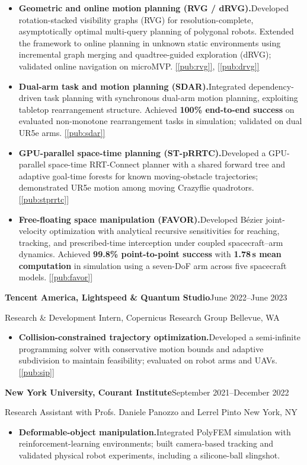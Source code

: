 \documentclass[11pt,letterpaper]{article}
\newcommand{\entry}[2]{\Needspace{6\baselineskip}\textbf{#1}\hfill #2\par}
\newcommand{\project}[2]{\item \textbf{#1}\enspace #2}
\newcommand{\paperref}[1]{\hyperref[pub:#1]{[\ref*{pub:#1}]}}
\begin{document}
\begin{itemize}
  \project{Geometric and online motion planning (RVG / dRVG).}{Developed
  rotation-stacked visibility graphs (RVG) for resolution-complete, asymptotically
  optimal multi-query planning of polygonal robots. Extended the framework to online planning
  in unknown static environments using incremental graph merging and
  quadtree-guided exploration (dRVG); validated online navigation on microMVP.
  \paperref{rvg}, \paperref{drvg}}

  \project{Dual-arm task and motion planning (SDAR).}{Integrated
  dependency-driven task planning with synchronous dual-arm motion planning,
  exploiting tabletop rearrangement structure. Achieved \textbf{100\% end-to-end success}
  on evaluated non-monotone
  rearrangement tasks in simulation; validated on dual UR5e arms. \paperref{sdar}}

  \project{GPU-parallel space-time planning (ST-pRRTC).}{Developed a
  GPU-parallel space-time RRT-Connect planner with
  a shared forward tree and adaptive goal-time forests for known moving-obstacle
  trajectories; demonstrated UR5e motion among moving Crazyflie quadrotors.
  \paperref{stprrtc}}

  \project{Free-floating space manipulation (FAVOR).}{Developed B\'ezier
  joint-velocity optimization with analytical recursive sensitivities for reaching,
  tracking, and prescribed-time interception under coupled spacecraft--arm dynamics.
  Achieved \textbf{99.8\% point-to-point success} with \textbf{1.78\,s mean computation}
  in simulation using a seven-DoF arm across five spacecraft models.
  \paperref{favor}}
\end{itemize}

\entry{Tencent America, Lightspeed \& Quantum Studio}{June 2022--June 2023}
Research \& Development Intern, Copernicus Research Group \hfill Bellevue, WA
\begin{itemize}
  \project{Collision-constrained trajectory optimization.}{Developed a
  semi-infinite programming solver with conservative motion bounds and adaptive
  subdivision to maintain feasibility; evaluated on robot arms and UAVs.
  \paperref{sip}}
\end{itemize}

\entry{New York University, Courant Institute}{September 2021--December 2022}
Research Assistant with Profs. Daniele Panozzo and Lerrel Pinto \hfill New York, NY
\begin{itemize}
  \project{Deformable-object manipulation.}{Integrated PolyFEM simulation with
  reinforcement-learning environments; built camera-based tracking and validated
  physical robot experiments, including a silicone-ball slingshot.}
\end{itemize}
\end{document}
